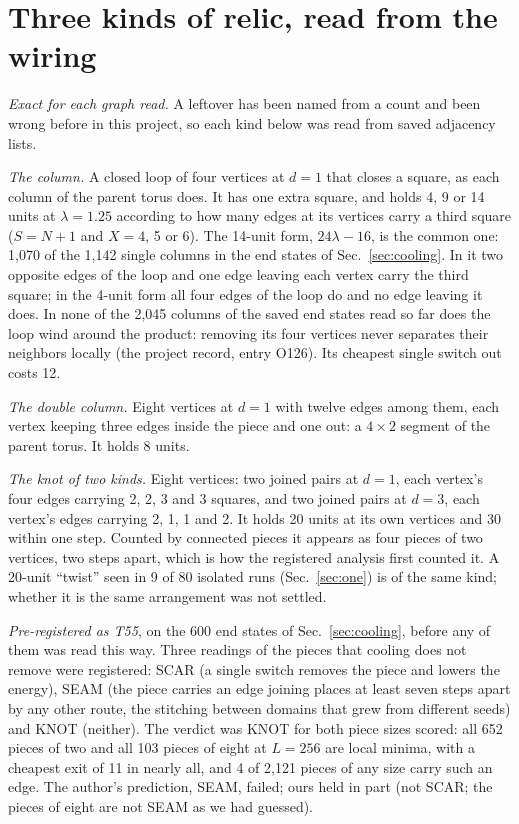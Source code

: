 \documentclass[aps,pre,10pt,twocolumn,superscriptaddress,nofootinbib]{revtex4-2}
\begin{document}
\section{Three kinds of relic, read from the wiring}
\label{sec:kinds}

\emph{Exact for each graph read.} A leftover has been named from a count and been wrong before in this project,
so each kind below was read from saved adjacency lists.

\emph{The column.} A closed loop of four vertices at $d = 1$ that closes a square, as each column of the
parent torus does. It has one extra square, and holds 4, 9 or 14 units at $\lambda = 1.25$ according to how
many edges at its vertices carry a third square ($S = N + 1$ and $X = 4$, 5 or 6). The 14-unit form,
$24\lambda - 16$, is the common one: 1,070 of the 1,142 single columns in the end states of
Sec.~\ref{sec:cooling}. In it two opposite edges of the loop and one edge leaving each vertex carry the
third square; in the 4-unit form all four edges of the loop do and no edge leaving it does. In none of the
2,045 columns of the saved end states read so far does the loop wind around the product: removing its four
vertices never separates their neighbors locally (the project record, entry O126). Its cheapest single switch
out costs 12.

\emph{The double column.} Eight vertices at $d = 1$ with twelve edges among them, each vertex keeping three
edges inside the piece and one out: a $4 \times 2$ segment of the parent torus. It holds 8 units.

\emph{The knot of two kinds.} Eight vertices: two joined pairs at $d = 1$, each vertex's four edges carrying 2,
2, 3 and 3 squares, and two joined pairs at $d = 3$, each vertex's edges carrying 2, 1, 1 and 2. It holds 20
units at its own vertices and 30 within one step. Counted by connected pieces it appears as four pieces of two vertices, two steps apart, which is how the
registered analysis first counted it. A 20-unit ``twist'' seen in 9 of 80 isolated runs (Sec.~\ref{sec:one}) is
of the same kind; whether it is the same arrangement was not settled.

\emph{Pre-registered as T55}, on the 600 end states of Sec.~\ref{sec:cooling}, before any of them was read
this way. Three readings of the pieces that cooling does not remove were registered: SCAR (a single switch
removes the piece and lowers the energy), SEAM (the piece carries an edge joining places at least seven steps
apart by any other route, the stitching between domains that grew from different seeds) and KNOT (neither). The
verdict was KNOT for both piece sizes scored: all 652 pieces of two and all 103 pieces of eight at $L = 256$ are local
minima, with a cheapest exit of 11 in nearly all, and 4 of 2,121 pieces of any size carry such an edge. The
author's prediction, SEAM, failed; ours held in part (not SCAR; the pieces of eight are not SEAM as we had
guessed).
\end{document}
